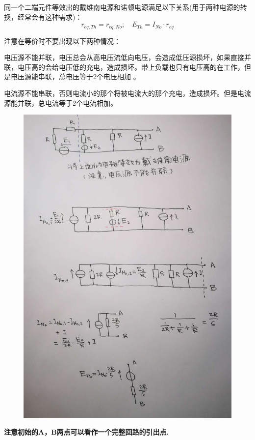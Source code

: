 \documentclass[12pt]{book}
\theoremstyle{definition}\newtheorem{dfn}{Définition}[chapter]
\theoremstyle{plain}\newtheorem{thm}{Théorème}[chapter]
\theoremstyle{plain}\newtheorem{prp}{Proposition}[chapter]
\theoremstyle{plain}\newtheorem{lem}{\bf Lemme}[chapter]
\theoremstyle{plain}\newtheorem{axm}{\bf Axiome}[chapter]
\theoremstyle{plain}\newtheorem{lmm}{\bf Lemme}[chapter]
\theoremstyle{plain}\newtheorem{cor}{\bf Corollaire}[chapter]
\theoremstyle{remark}\newtheorem{rem}{Remarque}[chapter]
\begin{document}
{\color{red} 同一个二端元件等效出的戴维南电源和诺顿电源满足以下关系(用于两种电源的转换，经常会有这种需求)：
$$r_{eq,Th}=r_{eq,No};\quad E_{Th}=I_{No}\cdot r_{eq}$$ } 

注意在等价时不要出现以下两种情况：

{\color{red}电压源不能并联}，电压总会从高电压流低向电压，会造成低压源损坏，如果直接并联，电压高的会给电压低的充电，造成损坏。带上负载也只有电压高的在工作，但是电压源能串联，总电压等于2个电压相加 。

{\color{red}电流源不能串联}，否则电流小的那个将被电流大的那个充电，造成损坏。但是电流源能并联，总电流等于2个电流相加。

\begin{figure}[H]
	\centering
	\includegraphics[scale=0.4]{Electrocinetique cadre et concepts de base//3}
\end{figure}
\textbf{注意初始的A，B两点可以看作一个完整回路的引出点.}
\end{document}
